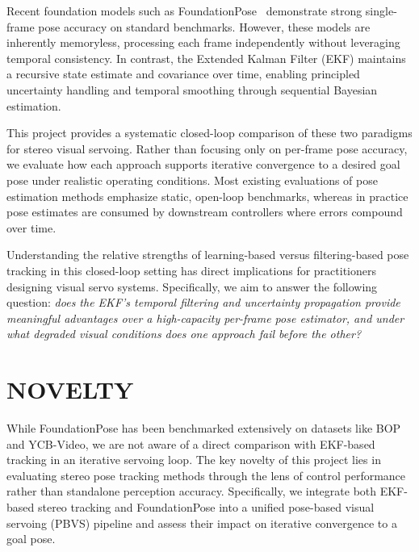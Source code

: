 \documentclass[letterpaper, 10 pt, conference]{ieeeconf}  %
\begin{document}
Recent foundation models such as FoundationPose~\cite{foundationpose} demonstrate strong single-frame pose accuracy on standard benchmarks. However, these models are inherently memoryless, processing each frame independently without leveraging temporal consistency. In contrast, the Extended Kalman Filter (EKF) maintains a recursive state estimate and covariance over time, enabling principled uncertainty handling and temporal smoothing through sequential Bayesian estimation.

This project provides a systematic closed-loop comparison of these two paradigms for stereo visual servoing. Rather than focusing only on per-frame pose accuracy, we evaluate how each approach supports iterative convergence to a desired goal pose under realistic operating conditions. Most existing evaluations of pose estimation methods emphasize static, open-loop benchmarks, whereas in practice pose estimates are consumed by downstream controllers where errors compound over time.

Understanding the relative strengths of learning-based versus filtering-based pose tracking in this closed-loop setting has direct implications for practitioners designing visual servo systems. Specifically, we aim to answer the following question: \emph{does the EKF's temporal filtering and uncertainty propagation provide meaningful advantages over a high-capacity per-frame pose estimator, and under what degraded visual conditions does one approach fail before the other?}

\section{NOVELTY}

While FoundationPose has been benchmarked extensively on datasets like BOP and YCB-Video, we are not aware of a direct comparison with EKF-based tracking in an iterative servoing loop. 
The key novelty of this project lies in evaluating stereo pose tracking methods through the lens of control performance rather than standalone perception accuracy. Specifically, we integrate both EKF-based stereo tracking and FoundationPose into a unified pose-based visual servoing (PBVS) pipeline and assess their impact on iterative convergence to a goal pose.
\end{document}
